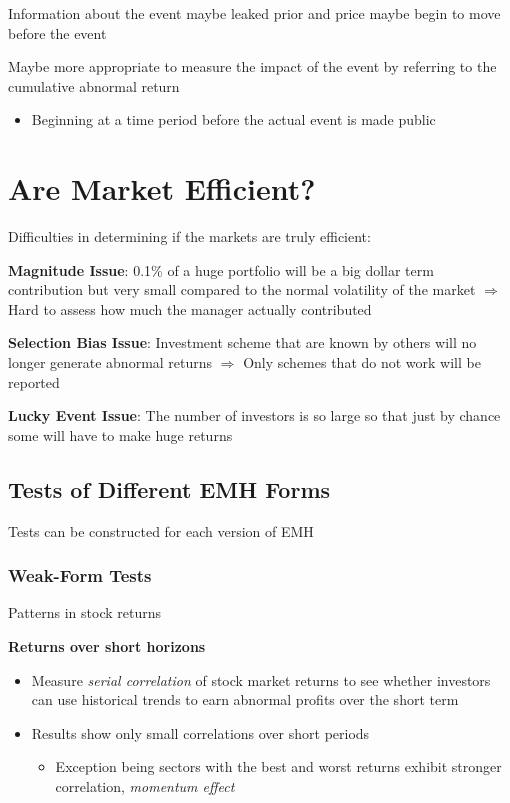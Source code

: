 \documentclass[]{book}
\providecommand{\tightlist}{%
  \setlength{\itemsep}{0pt}\setlength{\parskip}{0pt}}
\theoremstyle{definition}
\theoremstyle{definition}
\theoremstyle{remark}
\begin{document}
Information about the event maybe leaked prior and price maybe begin to
move before the event

Maybe more appropriate to measure the impact of the event by referring
to the cumulative abnormal return

\begin{itemize}
\tightlist
\item
  Beginning at a time period before the actual event is made public
\end{itemize}

\section{Are Market Efficient?}\label{are-market-efficient}

 Difficulties in determining if the markets are truly efficient:

\textbf{Magnitude Issue}: 0.1\% of a huge portfolio will be a big dollar
term contribution but very small compared to the normal volatility of
the market \(\Rightarrow\) Hard to assess how much the manager actually
contributed

\textbf{Selection Bias Issue}: Investment scheme that are known by
others will no longer generate abnormal returns \(\Rightarrow\) Only
schemes that do not work will be reported

\textbf{Lucky Event Issue}: The number of investors is so large so that
just by chance some will have to make huge returns

\subsection{Tests of Different EMH
Forms}\label{tests-of-different-emh-forms}

 Tests can be constructed for each version of EMH

\subsubsection{Weak-Form Tests}\label{weak-form-tests}

Patterns in stock returns

\textbf{Returns over short horizons}

\begin{itemize}
\item
  Measure \emph{serial correlation} of stock market returns to see
  whether investors can use historical trends to earn abnormal profits
  over the short term
\item
  Results show only small correlations over short periods

  \begin{itemize}
  \tightlist
  \item
    Exception being sectors with the best and worst returns exhibit
    stronger correlation, \emph{momentum effect}
  \end{itemize}
\end{itemize}
\end{document}
